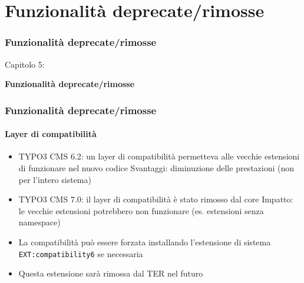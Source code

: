 %

\section{Funzionalità deprecate/rimosse}
\begin{frame}[fragile]
	\frametitle{Funzionalità deprecate/rimosse}

	\begin{center}\huge{Capitolo 5:}\end{center}
	\begin{center}\huge{\color{typo3darkgrey}\textbf{Funzionalità deprecate/rimosse}}\end{center}

\end{frame}


\begin{frame}[fragile]
	\frametitle{Funzionalità deprecate/rimosse}
	\framesubtitle{Layer di compatibilità}

	\begin{itemize}

		\item TYPO3 CMS 6.2: un layer di compatibilità permetteva alle vecchie estensioni di funzionare nel nuovo codice\newline
			\small
				Svantaggi: diminuzione delle prestazioni (non per l'intero sistema)
			\normalsize

		\item TYPO3 CMS 7.0: il layer di compatibilità è stato rimosso dal core\newline
			\small
				Impatto: le vecchie estensioni potrebbero non funzionare (es. estensioni senza namespace)
			\normalsize

		\item La compatibilità può essere forzata installando l'estensione di sistema \texttt{EXT:compatibility6} se necessaria
		\item Questa estensione sarà rimossa dal TER nel futuro

	\end{itemize}

\end{frame}

